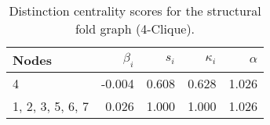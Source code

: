 \begin{table}
\centering
\caption{\label{tab:sf4}Distinction centrality scores for the structural fold graph (4-Clique).}
\centering
\begin{tabular}[t]{lrrrr}
\toprule
Nodes & $\beta_i$ & $s_i$ & $\kappa_i$ & $\alpha$\\
\midrule
4 & -0.004 & 0.608 & 0.628 & 1.026\\
1, 2, 3, 5, 6, 7 & 0.026 & 1.000 & 1.000 & 1.026\\
\bottomrule
\end{tabular}
\end{table}
